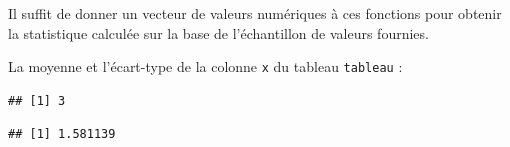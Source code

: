 \documentclass[
  11pt,
]{book}
\newenvironment{Shaded}{\begin{snugshade}}{\end{snugshade}}
\newcommand{\FunctionTok}[1]{\textcolor[rgb]{0.13,0.29,0.53}{\textbf{#1}}}
\newcommand{\NormalTok}[1]{#1}
\newcommand{\SpecialCharTok}[1]{\textcolor[rgb]{0.81,0.36,0.00}{\textbf{#1}}}
\numberwithin{equation}{section}
\numberwithin{countremarque}{section}
\begin{document}
Il suffit de donner un vecteur de valeurs numériques à ces fonctions pour obtenir la statistique calculée sur la base de l'échantillon de valeurs fournies.

La moyenne et l'écart-type de la colonne \texttt{x} du tableau \texttt{tableau} :

\begin{Shaded}
\end{Shaded}

\begin{lstlisting}
## [1] 3
\end{lstlisting}

\begin{Shaded}
\end{Shaded}

\begin{lstlisting}
## [1] 1.581139
\end{lstlisting}
\end{document}
